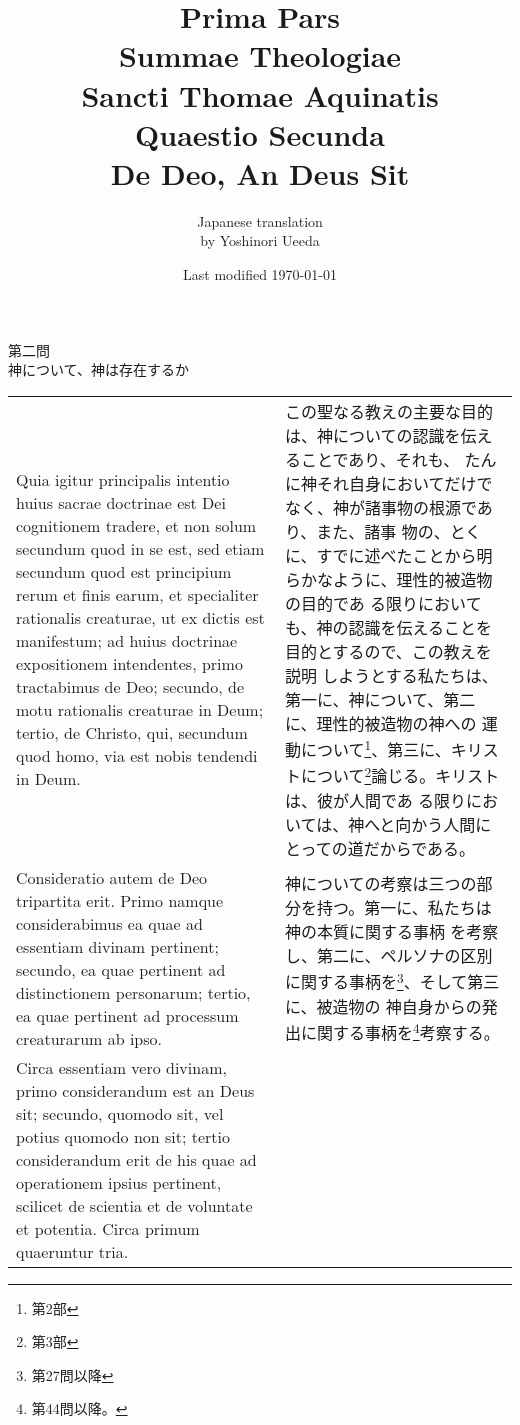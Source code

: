 \documentclass[10pt]{jsarticle} %
\title{{\bf Prima Pars}\\{\HUGE Summae Theologiae}\\Sancti Thomae
Aquinatis\\Quaestio Secunda\\{\bf De Deo, An Deus Sit}}
\author{Japanese translation\\by Yoshinori {\sc Ueeda}}
\date{Last modified \today}
\begin{document}
\maketitle
\begin{center}
 {\Large 第二問\\神について、神は存在するか}
\end{center}

\begin{longtable}{p{21em}p{21em}}
Quia igitur principalis intentio huius sacrae
doctrinae est Dei cognitionem tradere, et non solum secundum quod in se
est, sed etiam secundum quod est principium rerum et finis earum, et
specialiter rationalis creaturae, ut ex dictis est manifestum; ad huius
doctrinae expositionem intendentes, primo tractabimus de Deo; secundo,
de motu rationalis creaturae in Deum; tertio, de Christo, qui, secundum
quod homo, via est nobis tendendi in Deum. 

&

この聖なる教えの主要な目的は、神についての認識を伝えることであり、それも、
 たんに神それ自身においてだけでなく、神が諸事物の根源であり、また、諸事
 物の、とくに、すでに述べたことから明らかなように、理性的被造物の目的であ
 る限りにおいても、神の認識を伝えることを目的とするので、この教えを説明
 しようとする私たちは、第一に、神について、第二に、理性的被造物の神への
 運動について\footnote{第2部}、第三に、キリストについて\footnote{第3部}論じる。キリストは、彼が人間であ
 る限りにおいては、神へと向かう人間にとっての道だからである。

\\

Consideratio autem de Deo
tripartita erit. Primo namque considerabimus ea quae ad essentiam
divinam pertinent; secundo, ea quae pertinent ad distinctionem
personarum; tertio, ea quae pertinent ad processum creaturarum ab
ipso. 

&

神についての考察は三つの部分を持つ。第一に、私たちは神の本質に関する事柄
 を考察し、第二に、ペルソナの区別に関する事柄を\footnote{第27問以降}、そして第三に、被造物の
 神自身からの発出に関する事柄を\footnote{第44問以降。}考察する。

\\

Circa essentiam vero divinam, primo considerandum est an Deus sit;
secundo, quomodo sit, vel potius quomodo non sit; tertio considerandum
erit de his quae ad operationem ipsius pertinent, scilicet de scientia
et de voluntate et potentia. Circa primum quaeruntur tria. 


\end{longtable}
\end{document}
